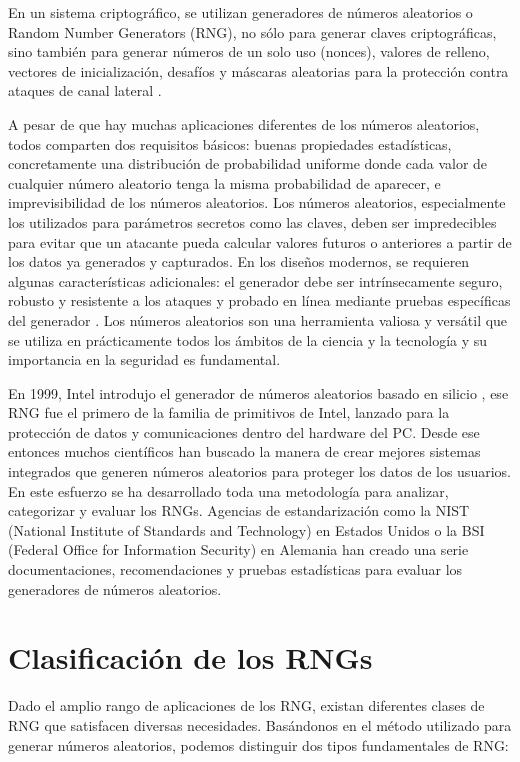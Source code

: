     En un sistema criptográfico, se utilizan generadores de números aleatorios o Random Number Generators (RNG), no sólo para generar claves criptográficas, sino también para generar números de un solo uso (nonces), valores de relleno, vectores de inicialización, desafíos y máscaras aleatorias para la protección contra ataques de canal lateral \cite{Petura2016}.

    A pesar de que hay muchas aplicaciones diferentes de los números aleatorios, todos comparten dos requisitos básicos: buenas propiedades estadísticas, concretamente una distribución de probabilidad uniforme donde cada valor de cualquier número aleatorio tenga la misma probabilidad de aparecer, e imprevisibilidad de los números aleatorios. Los números aleatorios, especialmente los utilizados para parámetros secretos como las claves, deben ser impredecibles para evitar que un atacante pueda calcular valores futuros o anteriores a partir de los datos ya generados y capturados. En los diseños modernos, se requieren algunas características adicionales: el generador debe ser intrínsecamente seguro, robusto y resistente a los ataques y probado en línea mediante pruebas específicas del generador \cite{Badrignans2011}. Los números aleatorios son una herramienta valiosa y versátil que se utiliza en prácticamente todos los ámbitos de la ciencia y la tecnología y su importancia en la seguridad es fundamental.

    En 1999, Intel introdujo el generador de números aleatorios basado en silicio \cite{Jun1999}, ese RNG fue el primero de la familia de primitivos de Intel, lanzado para la protección de datos y comunicaciones dentro del hardware del PC. Desde ese entonces muchos científicos han buscado la manera de crear mejores sistemas integrados que generen números aleatorios para proteger los datos de los usuarios. En este esfuerzo se ha desarrollado toda una metodología para analizar, categorizar y evaluar los RNGs. Agencias de estandarización como la NIST (National Institute of Standards and Technology) \cite{Turan2018} en Estados Unidos o la BSI (Federal Office for Information Security) \cite{AIS2011} en Alemania han creado una serie documentaciones, recomendaciones y pruebas estadísticas para evaluar los generadores de números aleatorios.

 \section{Clasificación de los RNGs}

        Dado el amplio rango de aplicaciones de los RNG, existan diferentes clases de RNG que satisfacen diversas necesidades. Basándonos en el método utilizado para generar números aleatorios, podemos distinguir dos tipos fundamentales de RNG:
	        
